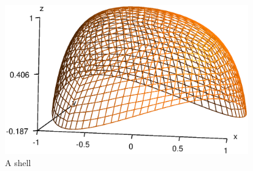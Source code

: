 \begin{figure}[ht] \centering
  \includegraphics[width=105mm]{bumpy}
  \caption{A shell}
  \label{\numb section 2.\numb fig 16}
\end{figure}

